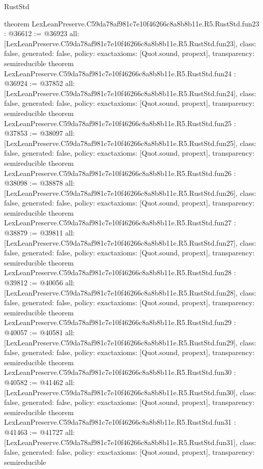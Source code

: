 \begin{lexlean}{RustStd}
\begin{coremodule}
{}
theorem LexLeanPreserve.C59da78af981c7e10f46266c8a8b8b11e.R5.RustStd.fun23 : @36612 := @36923 {
  all: [LexLeanPreserve.C59da78af981c7e10f46266c8a8b8b11e.R5.RustStd.fun23],
  class: false,
  generated: false,
  policy: exact{axioms: [Quot.sound, propext]},
  transparency: semireducible
}
theorem LexLeanPreserve.C59da78af981c7e10f46266c8a8b8b11e.R5.RustStd.fun24 : @36924 := @37852 {
  all: [LexLeanPreserve.C59da78af981c7e10f46266c8a8b8b11e.R5.RustStd.fun24],
  class: false,
  generated: false,
  policy: exact{axioms: [Quot.sound, propext]},
  transparency: semireducible
}
theorem LexLeanPreserve.C59da78af981c7e10f46266c8a8b8b11e.R5.RustStd.fun25 : @37853 := @38097 {
  all: [LexLeanPreserve.C59da78af981c7e10f46266c8a8b8b11e.R5.RustStd.fun25],
  class: false,
  generated: false,
  policy: exact{axioms: [Quot.sound, propext]},
  transparency: semireducible
}
theorem LexLeanPreserve.C59da78af981c7e10f46266c8a8b8b11e.R5.RustStd.fun26 : @38098 := @38878 {
  all: [LexLeanPreserve.C59da78af981c7e10f46266c8a8b8b11e.R5.RustStd.fun26],
  class: false,
  generated: false,
  policy: exact{axioms: [Quot.sound, propext]},
  transparency: semireducible
}
theorem LexLeanPreserve.C59da78af981c7e10f46266c8a8b8b11e.R5.RustStd.fun27 : @38879 := @39811 {
  all: [LexLeanPreserve.C59da78af981c7e10f46266c8a8b8b11e.R5.RustStd.fun27],
  class: false,
  generated: false,
  policy: exact{axioms: [Quot.sound, propext]},
  transparency: semireducible
}
theorem LexLeanPreserve.C59da78af981c7e10f46266c8a8b8b11e.R5.RustStd.fun28 : @39812 := @40056 {
  all: [LexLeanPreserve.C59da78af981c7e10f46266c8a8b8b11e.R5.RustStd.fun28],
  class: false,
  generated: false,
  policy: exact{axioms: [Quot.sound, propext]},
  transparency: semireducible
}
theorem LexLeanPreserve.C59da78af981c7e10f46266c8a8b8b11e.R5.RustStd.fun29 : @40057 := @40581 {
  all: [LexLeanPreserve.C59da78af981c7e10f46266c8a8b8b11e.R5.RustStd.fun29],
  class: false,
  generated: false,
  policy: exact{axioms: [Quot.sound, propext]},
  transparency: semireducible
}
theorem LexLeanPreserve.C59da78af981c7e10f46266c8a8b8b11e.R5.RustStd.fun30 : @40582 := @41462 {
  all: [LexLeanPreserve.C59da78af981c7e10f46266c8a8b8b11e.R5.RustStd.fun30],
  class: false,
  generated: false,
  policy: exact{axioms: [Quot.sound, propext]},
  transparency: semireducible
}
theorem LexLeanPreserve.C59da78af981c7e10f46266c8a8b8b11e.R5.RustStd.fun31 : @41463 := @41727 {
  all: [LexLeanPreserve.C59da78af981c7e10f46266c8a8b8b11e.R5.RustStd.fun31],
  class: false,
  generated: false,
  policy: exact{axioms: [Quot.sound, propext]},
  transparency: semireducible
}
\end{coremodule}
\end{lexlean}
